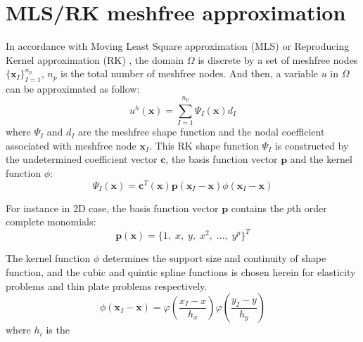 \documentclass{article}
\begin{document}
\section{MLS/RK meshfree approximation}
In accordance with Moving Least Square approximation (MLS) \cite{belytschkoElementFreeGalerkin1994} or Reproducing Kernel approximation (RK) \cite{liu1995reproducing}, the domain $\Omega$ is discrete by a set of meshfree nodes $\{\boldsymbol x_I\}_{I=1}^{n_p}$, $n_p$ is the total number of meshfree nodes. And then, a variable $u$ in $\Omega$ can be approximated as follow:
\begin{equation}
    u^h(\boldsymbol x) = \sum_{I=1}^{n_p} \Psi_I(\boldsymbol x) d_I
\end{equation}
where $\Psi_I$ and $d_I$ are the meshfree shape function and the nodal coefficient associated with meshfree node $\boldsymbol x_I$. This RK shape function $\Psi_I$ is constructed by the undetermined coefficient vector $\boldsymbol c$, the basis function vector $\boldsymbol p$ and the kernel function $\phi$:
\begin{equation}
    \Psi_I(\boldsymbol x) = \boldsymbol c^{T}(\boldsymbol x) \boldsymbol p(\boldsymbol x_I - \boldsymbol x) \phi(\boldsymbol x_I - \boldsymbol x)
    \label{shapefunction}
\end{equation} \par
For instance in 2D case, the basis function vector $\boldsymbol p$ contains the $p$th order complete monomials:
\begin{equation}
    \boldsymbol p(\boldsymbol x) = \{1,\;x,\;y,\;x^2,\;\dots,\;y^p\}^T
\end{equation} \par
The kernel function $\phi$ determines the support size and continuity of shape function, and the cubic and quintic spline functions is chosen herein for elasticity problems and thin plate problems respectively.
\begin{equation}
    \phi(\boldsymbol x_I - \boldsymbol x) = \varphi(\frac{x_I-x}{h_x})\varphi(\frac{y_I-y}{h_y})
\end{equation}
where $h_i$ is the 
\end{document}
